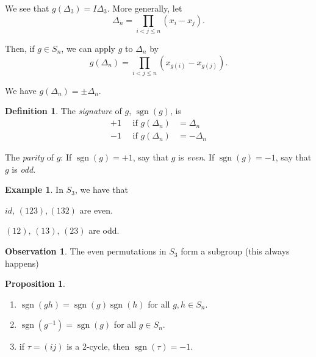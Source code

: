 \documentclass{article}
\theoremstyle{definition}
\newtheorem{definition}{Definition}
\newtheorem{proposition}{Proposition}
\newtheorem*{exmp}{Example}
\newtheorem*{obvs}{Observation}
\newcommand{\dtn}{\Delta_n}
\DeclareMathOperator{\sgn}{sgn}
\begin{document}
\noindent We see that $g(\Delta_3)=I\Delta_3$. More generally, let $$\Delta_n = \prod_{i<j\leq n} (x_i - x_j ). $$ 

\noindent Then, if $g \in S_n$, we can apply $g$ to $\Delta_n$ by 
$$g(\Delta_n) = \prod_{i<j\leq n}(x_{g(i)} - x_{g(j)}).$$

\noindent We have $g(\Delta_n) = \pm\Delta_n$.\\
\begin{definition}
  The \emph{signature} of $g$, $\sgn(g)$, is 
  \begin{align*}
    +1 \quad \text{ if } g(\dtn) &= \dtn \\
    -1 \quad \text{ if } g(\dtn) &= -\dtn
  \end{align*}
\end{definition}

The \emph{parity} of $g$: If $\sgn(g)=+1$, say that $g$ is \emph{even}.
If $\sgn(g)=-1$, say that $g$ is \emph{odd}.\\

\begin{exmp}
  
In $S_3$, we have that 

$id,\,(1 2 3), (1 3 2)$ are even.

$(1 2),\, (1 3),\,(2 3)$ are odd.\\
\end{exmp}
\begin{obvs}
  
The even permutations in $S_3$ form a subgroup (this always happens)\\
\end{obvs}


\begin{proposition}
  \label{prp:sgn}\hfill
  \begin{enumerate}
    \item $\sgn(gh)=\sgn(g)\sgn(h)$ for all $g,h \in S_n$.
    \item $\sgn(g^{-1})=\sgn(g)$ for all $g \in S_n$.
    \item if $\tau=(i j)$ is a 2-cycle, then $\sgn(\tau)=-1$.
  \end{enumerate}
\end{proposition}
\end{document}
